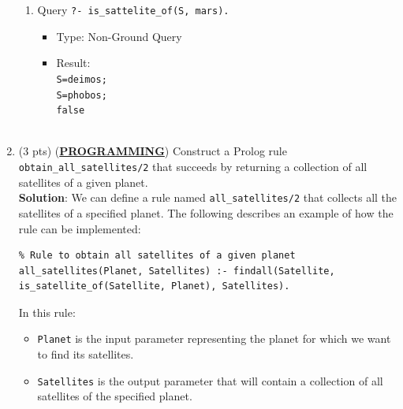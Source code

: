 \documentclass[12pt]{article}
\begin{document}
\begin{spacing}{1.5}
\begin{enumerate}
\begin{enumerate}
		      	\item 
		      	      Query \texttt{?- is\_sattelite\_of(S, mars).}
		      	      \begin{itemize}
		      	      	\item Type: Non-Ground Query
		      	      	\item Result: \texttt{\\
		      	      		S=deimos;\\
		      	      		S=phobos;\\
		      	      	false\\}\\
		      	      \end{itemize}
		      	              
		      \end{enumerate}
		      		      		      		      		      		      		      		      
		\item
		      (3 pts) (\uline{\textbf{PROGRAMMING}}) Construct a Prolog rule \texttt{obtain\_all\_satellites/2}
		      that succeeds by returning a collection of all satellites of a given planet.\\
		      		      		      		      		      		      		      		      
		      \textbf{Solution}: We can define a rule named \texttt{all\_satellites/2} that collects all the satellites of a specified planet. The following describes an example of how the rule can be implemented:\\
		      		      		      		      		      		      		      		      
		      \begin{lstlisting}
% Rule to obtain all satellites of a given planet
all_satellites(Planet, Satellites) :- findall(Satellite, is_satellite_of(Satellite, Planet), Satellites).
		      \end{lstlisting}
		      		      		      		      		      		      		      		      
		      In this rule:
		      \begin{itemize}
		      	\item \texttt{Planet} is the input parameter representing the planet for which we want to           find its satellites.
		      	       
		      	\item \texttt{Satellites} is the output parameter that will contain a collection of all satellites of the specified planet.
		      	       

\end{itemize}
\end{enumerate}
\end{spacing}
\end{document}
